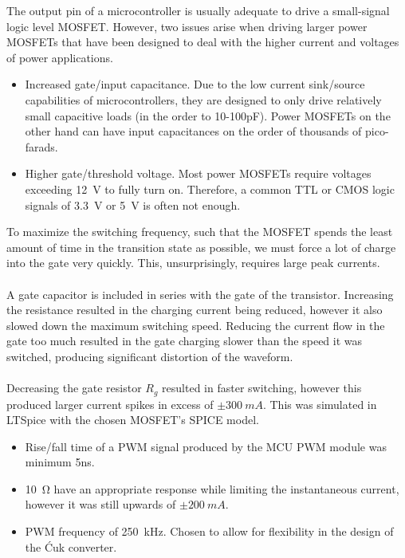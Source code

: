 The output pin of a microcontroller is usually adequate to drive a small-signal logic level MOSFET. However, two issues arise when driving larger power MOSFETs that have been designed to deal with the higher current and voltages of power applications.
\begin{itemize}
    \item Increased gate/input capacitance. Due to the low current sink/source capabilities of microcontrollers, they are designed to only drive relatively small capacitive loads (in the order to 10-100pF). Power MOSFETs on the other hand can have input capacitances on the order of thousands of pico-farads.
    \item Higher gate/threshold voltage. Most power MOSFETs require voltages exceeding \SI{12}{V} to fully turn on. Therefore, a common TTL or CMOS logic signals of \SI{3.3}{V} or \SI{5}{V} is often not enough.
\end{itemize}
To maximize the switching frequency, such that the MOSFET spends the least amount of time in the transition state as possible, we must force a lot of charge into the gate very quickly. This, unsurprisingly, requires large peak currents.
\\ \\
A gate capacitor is included in series with the gate of the transistor. Increasing the resistance resulted in the charging current being reduced, however it also slowed down the maximum switching speed. Reducing the current flow in the gate too much resulted in the gate charging slower than the speed it was switched, producing significant distortion of the waveform. 
\\ \\
Decreasing the gate resistor $R_g$ resulted in faster switching, however this produced larger current spikes in excess of $\pm\SI{300}{mA}$. This was simulated in LTSpice with the chosen MOSFET’s SPICE model.
\begin{itemize}
    \item Rise/fall time of a PWM signal produced by the MCU PWM module was minimum 5ns.
    \item \SI{10}{\ohm} have an appropriate response while limiting the instantaneous current, however it was still upwards of $\pm\SI{200}{mA}$.
    \item PWM frequency of \SI{250}{kHz}. Chosen to allow for flexibility in the design of the \'Cuk converter.
\end{itemize}
